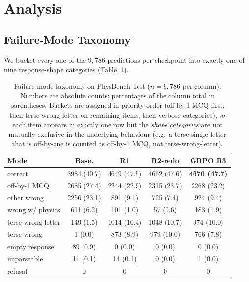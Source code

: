 \documentclass{article}
\begin{document}
\section{Analysis}
\label{sec:analysis}

\subsection{Failure-Mode Taxonomy}

We bucket every one of the $9{,}786$ predictions per checkpoint into
exactly one of nine response-shape categories
(Table~\ref{tab:failures}).

\begin{table}[t]
\caption{Failure-mode taxonomy on PhysBench Test ($n{=}9{,}786$ per
column). Numbers are absolute counts; percentages of the column total
in parentheses. Buckets are assigned in priority order
(off-by-1 MCQ first, then terse-wrong-letter on remaining items, then
verbose categories), so each item appears in exactly one row but the
\emph{shape categories} are not mutually exclusive in the underlying
behaviour (e.g.\ a terse single letter that is off-by-one is counted
as off-by-1 MCQ, not terse-wrong-letter).}
\label{tab:failures}
\centering
\scriptsize
\setlength{\tabcolsep}{3pt}
\begin{tabular}{lcccc}
\toprule
Mode & Base. & R1 & R2-redo & GRPO R3 \\
\midrule
correct              & 3984 (40.7) & 4649 (47.5) & 4662 (47.6) & \textbf{4670 (47.7)} \\
off-by-1 MCQ         & 2685 (27.4) & 2244 (22.9) & 2315 (23.7) & 2268 (23.2) \\
other wrong          & 2256 (23.1) & 891 (9.1)   & 725 (7.4)   & 924 (9.4)   \\
wrong w/ physics     & 611 (6.2)   & 101 (1.0)   & 57 (0.6)    & 183 (1.9)   \\
terse wrong letter   & 149 (1.5)   & 1014 (10.4) & 1048 (10.7) & 974 (10.0)  \\
terse wrong          & 1 (0.0)     & 873 (8.9)   & 979 (10.0)  & 766 (7.8)   \\
empty response       & 89 (0.9)    & 0 (0.0)     & 0 (0.0)     & 0 (0.0)     \\
unparseable          & 11 (0.1)    & 14 (0.1)    & 0 (0.0)     & 1 (0.0)     \\
refusal              & 0           & 0           & 0           & 0           \\
\bottomrule
\end{tabular}
\end{table}
\end{document}
